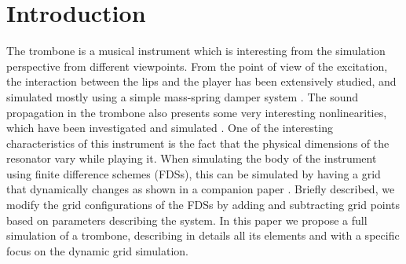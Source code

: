 \section{Introduction}\label{sec:introduction}

The trombone is a musical instrument which is interesting from the simulation perspective from different viewpoints.
From the point of view of the excitation, the interaction between the lips and the player has been extensively studied, and simulated mostly using a simple mass-spring damper system \cite{campbell2004brass}.
The sound propagation in the trombone also presents some very interesting nonlinearities, which have been investigated and simulated
\cite{msallam1997physical,msallam2000physical,campbell2004brass}.
One of the interesting characteristics of this instrument is the fact that the physical dimensions of the resonator vary while playing it.
When simulating the body of the instrument using finite difference schemes (FDSs), this can be simulated by having a grid that 
 dynamically changes as shown in a companion paper \cite{Willemsen2021}.
 Briefly described, we modify the grid configurations of the FDSs by adding and subtracting grid points based on parameters describing the system.
 In this paper we propose a full simulation of a trombone, describing in details all its elements and with a specific focus on the dynamic grid simulation.
 